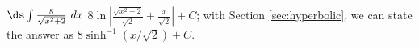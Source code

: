 {$\ds \int \frac8{\sqrt{x^2+2}}\ dx$
}
{$8\ln\left|\frac{\sqrt{x^2+2}}{\sqrt{2}}+\frac x{\sqrt{2}}\right|+C$; with Section \ref{sec:hyperbolic}, we can state the answer as $8\sinh^{-1}(x/\sqrt{2})+C$.
}